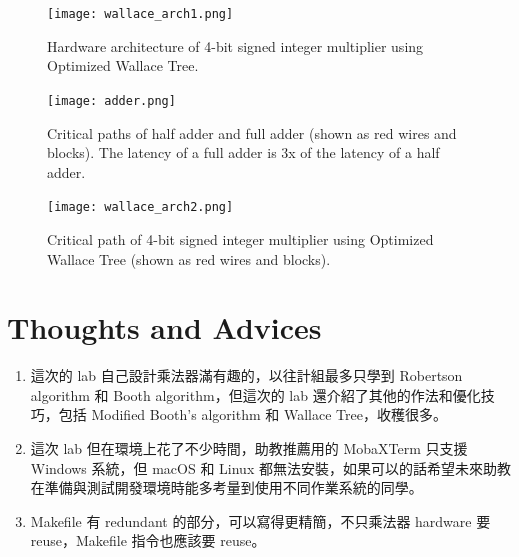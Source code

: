 \documentclass[12pt]{article}
\begin{document}
\begin{figure}[h]
    \centering
    \texttt{[image: wallace\_arch1.png]}
    \caption{Hardware architecture of 4-bit signed integer multiplier using Optimized Wallace Tree.}
    \label{fig:wallace_arch1}
\end{figure}

\begin{figure}[h]
    \centering
    \texttt{[image: adder.png]}
    \caption{Critical paths of half adder and full adder (shown as red wires and blocks). The latency of a full adder is 3x of the latency of a half adder.}
    \label{fig:adder}
\end{figure}

\begin{figure}[h]
    \centering
    \texttt{[image: wallace\_arch2.png]}
    \caption{Critical path of 4-bit signed integer multiplier using Optimized Wallace Tree (shown as red wires and blocks).}
    \label{fig:wallace_arch2}
\end{figure}

\newpage

\section{Thoughts and Advices}

\begin{enumerate}
    \item 這次的 lab 自己設計乘法器滿有趣的，以往計組最多只學到 Robertson algorithm 和 Booth algorithm，但這次的 lab 還介紹了其他的作法和優化技巧，包括 Modified Booth's algorithm 和 Wallace Tree，收穫很多。
    \item 這次 lab 但在環境上花了不少時間，助教推薦用的 MobaXTerm 只支援 Windows 系統，但 macOS 和 Linux 都無法安裝，如果可以的話希望未來助教在準備與測試開發環境時能多考量到使用不同作業系統的同學。
    \item Makefile 有 redundant 的部分，可以寫得更精簡，不只乘法器 hardware 要 reuse，Makefile 指令也應該要 reuse。
\end{enumerate}
\end{document}
